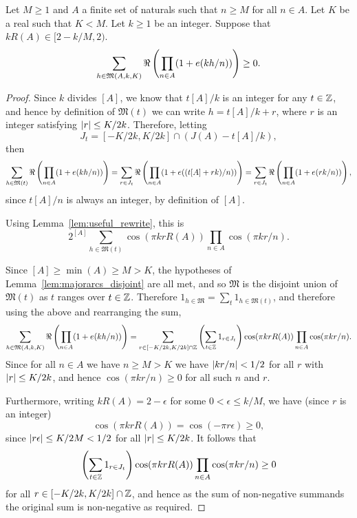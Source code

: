 \begin{lemma}\label{lem:majorarcs}
Let $M\geq 1$ and $A$ a finite set of naturals such that $n\geq M$ for all $n\in A$. Let $K$ be a real such that $K<M$. Let $k\geq 1$ be an integer. Suppose that $kR(A) \in [2-k/M,2)$.
\[\sum_{h\in \mathfrak{M}(A,k,K)}\Re\left( \prod_{n\in A}(1+e(kh/n))\right) \geq 0.\]
\end{lemma}
\begin{proof}
Since $k$ divides $[A]$, we know that $t[A]/k$ is an integer for any $t\in \mathbb{Z}$, and hence by definition of $\mathfrak{M}(t)$ we can write $h=t[A]/k+r$, where $r$ is an integer satisfying $\left\lvert r\right\rvert\leq K/2k$. Therefore, letting
\[J_t =[-K/2k,K/2k]\cap (J(A)-t[A]/k),\]
then
\[\sum_{h\in \mathfrak{M}(t)}\Re\left( \prod_{n\in A}(1+e(kh/n))\right)=\sum_{r\in J_t}\Re\left( \prod_{n\in A}(1+e((t[A]+rk)/n))\right)=\sum_{r\in J_t}\Re\left( \prod_{n\in A}(1+e(rk/n))\right),\]
since $t[A]/n$ is always an integer, by definition of $[A]$.

Using Lemma~\ref{lem:useful_rewrite}, this is
\[2^{[A]}\sum_{h\in \mathfrak{M}(t)}\cos(\pi krR(A))\prod_{n\in A}\cos(\pi kr/n).\]


Since $[A]\geq \min(A)\geq M>K$, the hypotheses of Lemma~\ref{lem:majorarcs_disjoint} are all met, and so $\mathfrak{M}$ is the disjoint union of $\mathfrak{M}(t)$ as $t$ ranges over $t\in \mathbb{Z}$. Therefore $1_{h\in\mathfrak{M}}=\sum_t 1_{h\in \mathfrak{M}(t)}$, and therefore using the above and rearranging the sum,
\[\sum_{h\in \mathfrak{M}(A,k,K)}\Re\left( \prod_{n\in A}(1+e(kh/n))\right)
=\sum_{r\in [-K/2k,K/2k]\cap\mathbb{Z}}\left( \sum_{t\in \mathbb{Z}}1_{r\in J_t}\right)\cos(\pi krR(A))\prod_{n\in A}\cos(\pi kr/n).\]
Since for all $n\in A$ we have $n\geq M>K$ we have $\left\lvert kr/n\right\rvert< 1/2$ for all $r$ with $\left\lvert r\right\rvert\leq K/2k$, and hence $\cos(\pi kr/n)\geq 0$ for all such $n$ and $r$.

Furthermore, writing $kR(A)=2-\epsilon$ for some $0<\epsilon\leq k/M$, we have (since $r$ is an integer)
\[\cos(\pi kr R(A)) = \cos(-\pi r\epsilon)\geq 0,\]
since $\left\lvert r\epsilon\right\rvert\leq K/2M<1/2$ for all $\left\lvert r\right\rvert\leq K/2k$. It follows that
\[\left( \sum_{t\in \mathbb{Z}}1_{r\in J_t}\right)\cos(\pi krR(A))\prod_{n\in A}\cos(\pi kr/n)\geq 0\]
for all $r\in [-K/2k,K/2k]\cap \mathbb{Z}$, and hence as the sum of non-negative summands the original sum is non-negative as required.
\end{proof}

